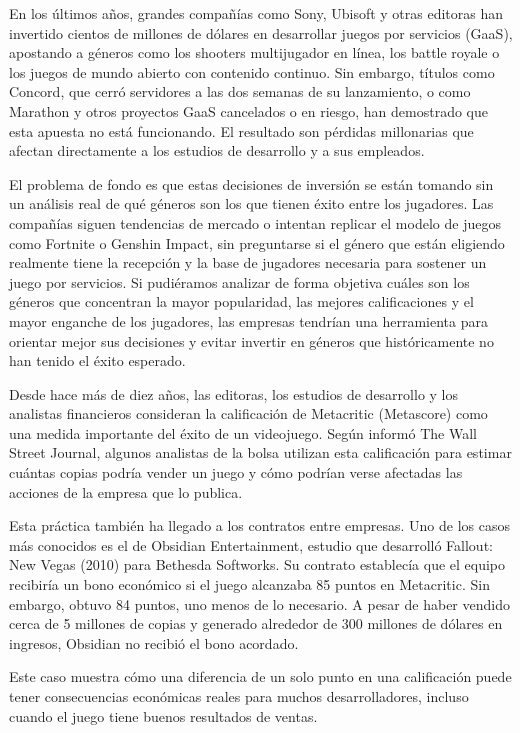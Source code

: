 \documentclass[letterpaper,11pt]{article}
\begin{document}
En los últimos años, grandes compañías como Sony, Ubisoft y otras editoras han invertido cientos de millones de dólares en desarrollar juegos por servicios (GaaS), apostando a géneros como los shooters multijugador en línea, los battle royale o los juegos de mundo abierto con contenido continuo. Sin embargo, títulos como Concord, que cerró servidores a las dos semanas de su lanzamiento, o como Marathon y otros proyectos GaaS cancelados o en riesgo, han demostrado que esta apuesta no está funcionando. El resultado son pérdidas millonarias que afectan directamente a los estudios de desarrollo y a sus empleados.

El problema de fondo es que estas decisiones de inversión se están tomando sin un análisis real de qué géneros son los que tienen éxito entre los jugadores. Las compañías siguen tendencias de mercado o intentan replicar el modelo de juegos como Fortnite o Genshin Impact, sin preguntarse si el género que están eligiendo realmente tiene la recepción y la base de jugadores necesaria para sostener un juego por servicios. Si pudiéramos analizar de forma objetiva cuáles son los géneros que concentran la mayor popularidad, las mejores calificaciones y el mayor enganche de los jugadores, las empresas tendrían una herramienta para orientar mejor sus decisiones y evitar invertir en géneros que históricamente no han tenido el éxito esperado.

Desde hace más de diez años, las editoras, los estudios de desarrollo y los analistas financieros consideran la calificación de Metacritic (Metascore) como una medida importante del éxito de un videojuego. Según informó The Wall Street Journal, algunos analistas de la bolsa utilizan esta calificación para estimar cuántas copias podría vender un juego y cómo podrían verse afectadas las acciones de la empresa que lo publica.

Esta práctica también ha llegado a los contratos entre empresas. Uno de los casos más conocidos es el de Obsidian Entertainment, estudio que desarrolló Fallout: New Vegas (2010) para Bethesda Softworks. Su contrato establecía que el equipo recibiría un bono económico si el juego alcanzaba 85 puntos en Metacritic. Sin embargo, obtuvo 84 puntos, uno menos de lo necesario. A pesar de haber vendido cerca de 5 millones de copias y generado alrededor de 300 millones de dólares en ingresos, Obsidian no recibió el bono acordado.

Este caso muestra cómo una diferencia de un solo punto en una calificación puede tener consecuencias económicas reales para muchos desarrolladores, incluso cuando el juego tiene buenos resultados de ventas.
\end{document}

